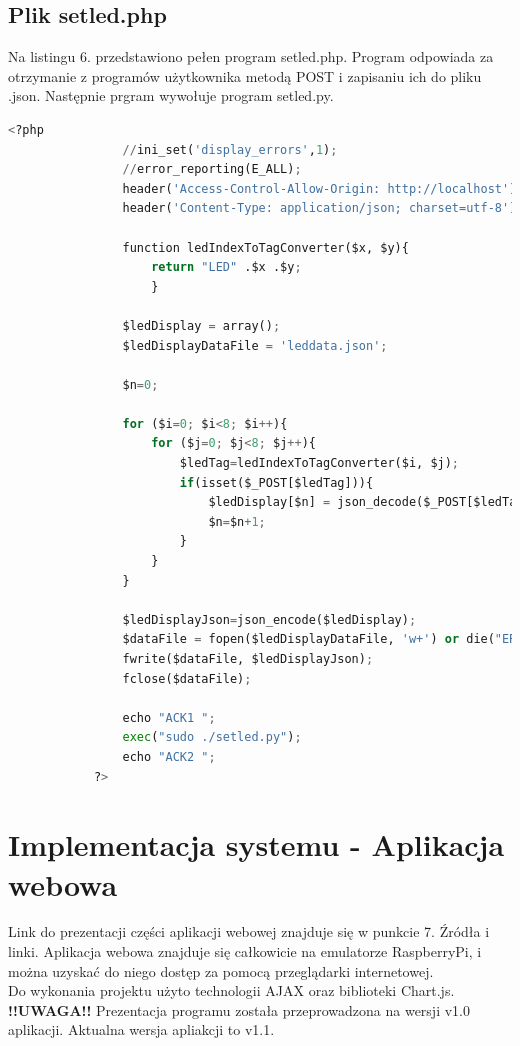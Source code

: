 \documentclass{article}
\begin{document}
		\subsection{Plik setled.php}
			Na listingu 6. przedstawiono pełen program setled.php. Program odpowiada za otrzymanie z programów użytkownika metodą POST i zapisaniu ich do pliku .json. Następnie prgram wywołuje program setled.py.
			\begin{lstlisting}[caption={Program setled.php}, language=Python, firstnumber=82]
			<?php
				//ini_set('display_errors',1);
				//error_reporting(E_ALL);
				header('Access-Control-Allow-Origin: http://localhost');
				header('Content-Type: application/json; charset=utf-8');
				
				function ledIndexToTagConverter($x, $y){
					return "LED" .$x .$y;
					}
				
				$ledDisplay = array();
				$ledDisplayDataFile = 'leddata.json';
				
				$n=0;
				
				for ($i=0; $i<8; $i++){
					for ($j=0; $j<8; $j++){
						$ledTag=ledIndexToTagConverter($i, $j);
						if(isset($_POST[$ledTag])){
							$ledDisplay[$n] = json_decode($_POST[$ledTag]);
							$n=$n+1;
						}
					}
				}
				
				$ledDisplayJson=json_encode($ledDisplay);
				$dataFile = fopen($ledDisplayDataFile, 'w+') or die("ERR1");
				fwrite($dataFile, $ledDisplayJson);
				fclose($dataFile);
				
				echo "ACK1 ";
				exec("sudo ./setled.py");
				echo "ACK2 ";
			?>
			\end{lstlisting} 
			
		\newpage
		\section{Implementacja systemu - Aplikacja webowa}
			Link do prezentacji części aplikacji webowej znajduje się w punkcie 7. Źródła i linki. Aplikacja webowa znajduje się całkowicie na emulatorze RaspberryPi, i można uzyskać do niego dostęp za pomocą przeglądarki internetowej.\\
			Do wykonania projektu użyto technologii AJAX oraz biblioteki Chart.js.\\
			\textbf{!!UWAGA!!} Prezentacja programu została przeprowadzona na wersji v1.0 aplikacji. Aktualna wersja apliakcji to v1.1.
\end{document}
